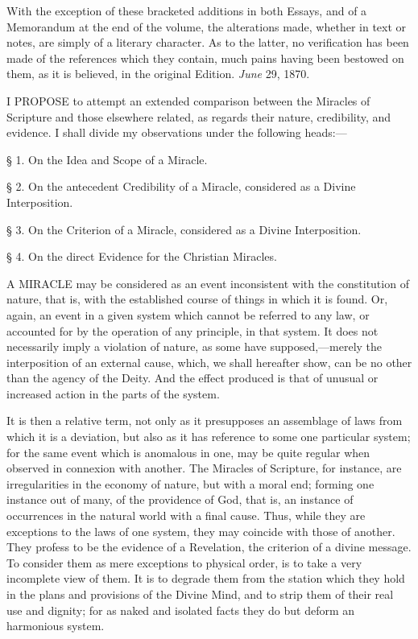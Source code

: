 With the exception of these bracketed additions in both Essays, and
of a Memorandum at the end of the volume, the alterations made,
whether in text or notes, are simply of a literary character. As to
the latter, no verification has been made of the references which they
contain, much pains having been bestowed on them, as it is believed,
in the original Edition.
\emph{June} 29, 1870.



I PROPOSE
to attempt an extended comparison between the Miracles of Scripture
and those elsewhere related, as regards their nature, credibility, and
evidence. I shall divide my observations under the following heads:—

§ 1. On the Idea and Scope of a Miracle.

§ 2. On the antecedent Credibility of a Miracle,
considered as a Divine Interposition.

§ 3. On the Criterion of a Miracle, considered
as a Divine Interposition.

§ 4. On the direct Evidence for the Christian
Miracles.


A MIRACLE
may be considered as an event inconsistent with the constitution of
nature, that is, with the established course of things in which it is
found. Or, again, an event in a given system which cannot be referred
to any law, or accounted for by the operation of any principle, in
that system. It does not necessarily imply a violation of nature, as
some have supposed,—merely the interposition of an external cause,
which, we shall hereafter show, can be no other than the agency of the
Deity. And the effect produced is that of unusual or increased action
in the parts of the system.

It is then a relative term, not only as it
presupposes an assemblage of laws from which it is a deviation, but
also as it has reference to some one particular system; for the same
event which is anomalous in one, may be quite regular when observed in
connexion with another. The Miracles of Scripture, for instance, are
irregularities in the economy of nature, but with a moral end;
forming one instance out of many, of the providence of God, that is,
an instance of occurrences in the natural world with a final cause.
Thus, while they are exceptions to the laws of one system, they may
coincide with those of another. They profess to be the evidence of a
Revelation, the criterion of a divine message. To consider them as
mere exceptions to physical order, is to take a very incomplete view
of them. It is to degrade them from the station which they hold in the
plans and provisions of the Divine Mind, and to strip them of their
real use and dignity; for as naked and isolated facts they do but
deform an harmonious system.

